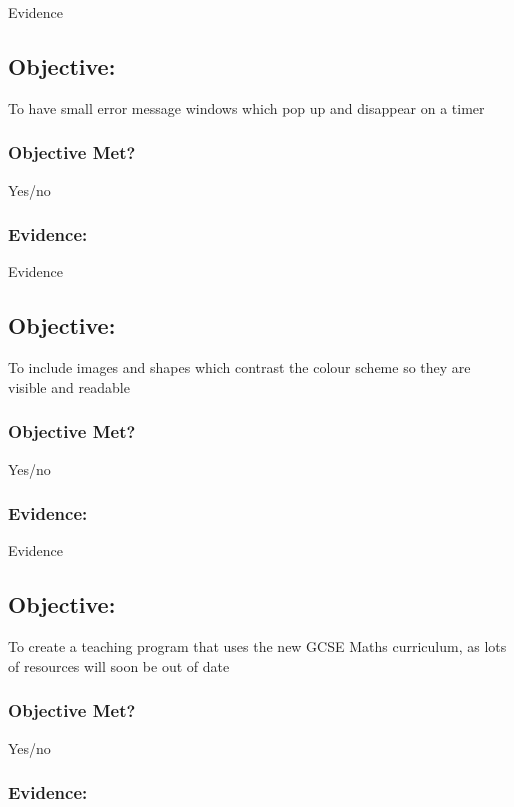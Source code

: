 Evidence

\subsection{Objective: }

To have small error message windows which pop up and disappear on a timer

\subsubsection{Objective Met?}

Yes/no 

\subsubsection{Evidence: }

Evidence

\subsection{Objective: }

To include images and shapes which contrast the colour scheme so they are visible and readable

\subsubsection{Objective Met?}

Yes/no 

\subsubsection{Evidence: }

Evidence

\subsection{Objective: }

To create a teaching program that uses the new GCSE Maths curriculum, as lots of resources will soon be out of date

\subsubsection{Objective Met?}

Yes/no 

\subsubsection{Evidence: }


